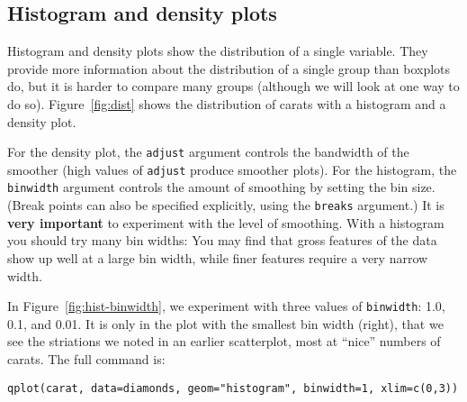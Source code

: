 \subsection{Histogram and density plots}\label{sub:distribution}

Histogram and density plots show the distribution of a single variable.  They provide more information about the distribution of a single group than boxplots do, but it is harder to compare many groups (although we will look at one way to do so).  Figure~\ref{fig:dist} shows the distribution of carats with a histogram and a density plot.

% 


For the density plot, the {\tt adjust} argument controls the bandwidth of the smoother (high values of {\tt adjust} produce smoother plots). For the histogram, the {\tt binwidth} argument controls the amount of smoothing by setting the bin size.  (Break points can also be specified explicitly, using the {\tt breaks} argument.) It is {\bf very important} to experiment with the level of smoothing.  With a histogram you should try many bin widths: You may find that gross features of the data show up well at a large bin width, while finer features require a very narrow width.

In Figure~\ref{fig:hist-binwidth}, we experiment with three values of {\tt binwidth}: 1.0, 0.1, and 0.01.  It is only in the plot with the smallest bin width (right), that we see the striations we noted in an earlier scatterplot, most at ``nice'' numbers of carats. The full command is:

{\tt qplot(carat, data=diamonds, geom="histogram", binwidth=1, xlim=c(0,3))}


%



